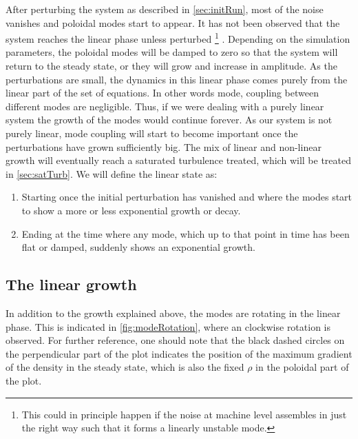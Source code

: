 After perturbing the system as described in \cref{sec:initRun}, most of the noise vanishes and poloidal modes start to appear.
It has not been observed that the system reaches the linear phase unless perturbed%
\footnote{This could in principle happen if the noise at machine level assembles in just the right way such that it forms a linearly unstable mode.}%
%
.
Depending on the simulation parameters, the poloidal modes will be damped to zero so that the system will return to the steady state, or they will grow and increase in amplitude.
As the perturbations are small, the dynamics in this linear phase comes purely from the linear part of the set of equations.
In other words mode, coupling between different modes are negligible.
Thus, if we were dealing with a purely linear system the growth of the modes would continue forever.
As our system is not purely linear, mode coupling will start to become important once the perturbations have grown sufficiently big.
The mix of linear and non-linear growth will eventually reach a saturated turbulence treated, which will be treated in \cref{sec:satTurb}.
We will define the linear state as:
%
\begin{enumerate}
    \item Starting once the initial perturbation has vanished and where the modes start to show a more or less exponential growth or decay.
    \item Ending at the time where any mode, which up to that point in time has been flat or damped, suddenly shows an exponential growth.
\end{enumerate}
%

\subsection{The linear growth}
%
In addition to the growth explained above, the modes are rotating in the linear phase.
This is indicated in \cref{fig:modeRotation}, where an clockwise rotation is observed.
For further reference, one should note that the black dashed circles on the perpendicular part of the plot indicates the position of the maximum gradient of the density in the steady state, which is also the fixed $\rho$ in the poloidal part of the plot.

